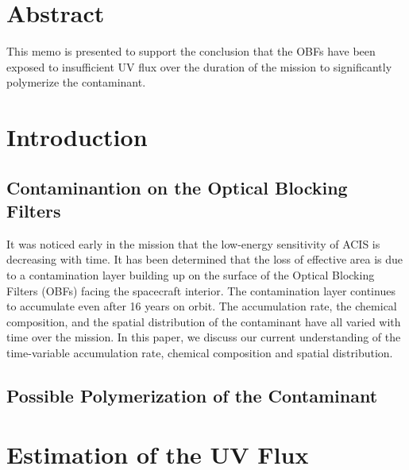 \documentclass[11pt]{article}
\begin{document}


\Date{\today}


\memo{}

\section{Abstract}

This memo is presented to support the conclusion that the OBFs have been exposed
to insufficient UV flux over the duration of the mission to significantly polymerize
the contaminant.

\section{Introduction}

\subsection{Contaminantion on the Optical Blocking Filters}

It was noticed early in the mission that the low-energy sensitivity of ACIS is
decreasing with time. It has been determined that the loss of effective area is
due to a contamination layer building up on the surface of the Optical Blocking
Filters (OBFs) facing the spacecraft interior. The contamination layer continues
to accumulate even after 16 years on orbit. The accumulation rate, the chemical
composition, and the spatial distribution of the contaminant have all varied with
time over the mission. In this paper, we discuss our current understanding of the
time-variable accumulation rate, chemical composition and spatial distribution.

\subsection{Possible Polymerization of the Contaminant}

\section{Estimation of the UV Flux}
\end{document}
